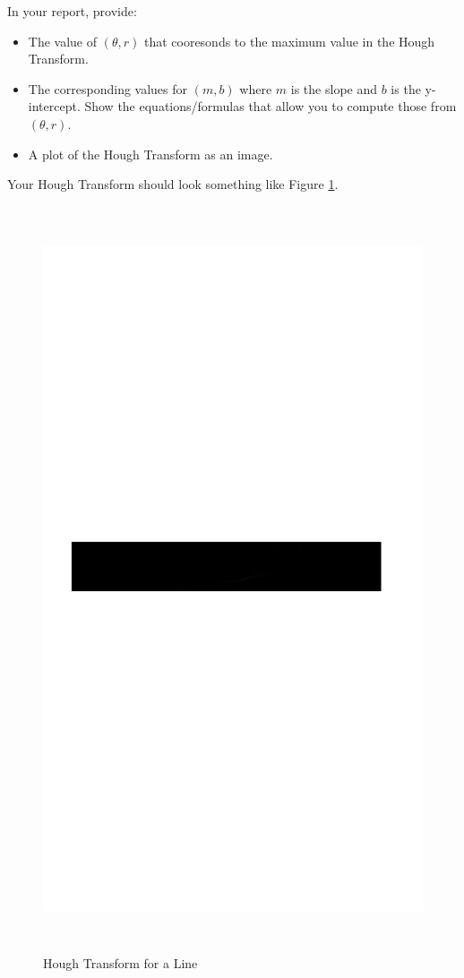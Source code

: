\documentclass[12pt]{article}
\begin{document}
\noindent
In your report, provide:
\begin{itemize}
\item The value of $(\theta, r)$ that cooresonds to the maximum value in the Hough Transform.
\item The corresponding values for $(m,b)$ where $m$ is the slope and $b$ is the y-intercept.  Show the equations/formulas that allow you to compute those from $(\theta,r)$.
\item A plot of the Hough Transform as an image.
\end{itemize}

\noindent
Your Hough Transform should look something like Figure \ref{fig2}.

\begin{figure}[H]
\begin{center}
\includegraphics[width=\textwidth, height=22cm]{part3.png}
\caption{Hough Transform for a Line}
\label{fig2}
\end{center}
\end{figure}
\end{document}
